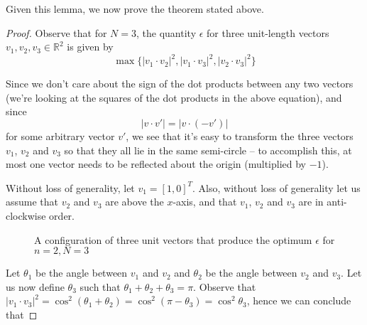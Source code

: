 \documentclass[11pt,letterpaper,twoside,english]{article}
\theoremstyle{theorem}
\theoremstyle{remark}
\begin{document}
Given this lemma, we now prove the theorem stated above.

\begin{proof}
Observe that for $N=3$, the quantity $\epsilon$ for three unit-length vectors $v_1, v_2, v_3 \in \mathbb{R}^2$ is given by $$\max \{ |v_1 \cdot v_2|^2, |v_1 \cdot v_3|^2, |v_2 \cdot v_3|^2 \}$$

Since we don't care about the sign of the dot products between any two vectors (we're looking at the squares of the dot products in the above equation), and since $$|v \cdot v'| = |v \cdot (-v')|$$ for some arbitrary vector $v'$, we see that it's easy to transform the three vectors $v_1$, $v_2$ and $v_3$ so that they all lie in the same semi-circle -- to accomplish this, at most one vector needs to be reflected about the origin (multiplied by $-1$).

Without loss of generality, let $v_1 = [1, 0]^T$. Also, without loss of generality let us assume that $v_2$ and $v_3$ are above the $x$-axis, and that $v_1$, $v_2$ and $v_3$ are in anti-clockwise order.

\begin{figure}[!h]
    \centering
    \caption{A configuration of three unit vectors that produce the optimum $\epsilon$ for $n=2, N=3$}
\end{figure}


Let $\theta_1$ be the angle between $v_1$ and $v_2$ and $\theta_2$ be the angle between $v_2$ and $v_3$. Let us now define $\theta_3$ such that $\theta_1 + \theta_2 + \theta_3 = \pi$. Observe that $|v_1 \cdot v_3|^2 = \cos^2(\theta_1 + \theta_2) = \cos^2 (\pi - \theta_3) = \cos^2 \theta_3$, hence we can conclude that


\end{proof}
\end{document}
